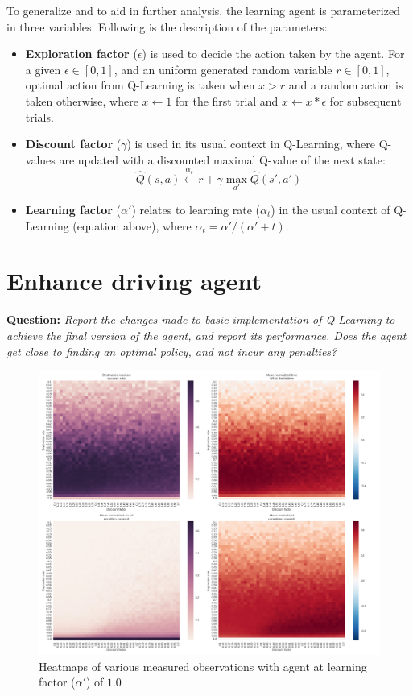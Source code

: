 \documentclass{article}
\begin{document}
	To generalize and to aid in further analysis, the learning agent is parameterized in three variables. Following is the description of the parameters:
	\begin{itemize}
		\item \textbf{Exploration factor} ($\epsilon$) is used to decide the action taken by the agent. For a given $\epsilon \in [0,1]$, and an uniform generated random variable $r \in [0,1]$, optimal action from Q-Learning is taken when $x > r$ and a random action is taken otherwise, where $x \leftarrow 1$ for the first trial and $x \leftarrow x * \epsilon$ for subsequent trials.
		\item \textbf{Discount factor} ($\gamma$) is used in its usual context in Q-Learning, where Q-values are updated with a discounted maximal Q-value of the next state: \[\hat{Q}(s,a) \xleftarrow{\alpha_t} r + \gamma \max_{a\prime} \hat{Q}(s\prime, a\prime) \]
		\item \textbf{Learning factor} ($\alpha\prime$) relates to learning rate ($\alpha_t$) in the usual context of Q-Learning (equation above), where $\alpha_t = \alpha\prime / (\alpha\prime + t)$.
	\end{itemize}
	
	\section{Enhance driving agent}
	\textbf{Question:} \emph{Report the changes made to basic implementation of Q-Learning to achieve the final version of the agent, and report its performance. Does the agent get close to finding an optimal policy, and not incur any penalties?}
	
	\begin{figure}[b]
		\centering
		\includegraphics[scale=0.38]{plots_learning_1}
		\caption{Heatmaps of various measured observations with agent at learning factor ($\alpha\prime$) of $1.0$}
		\label{fig:learning_1}
	\end{figure}
	
\end{document}
